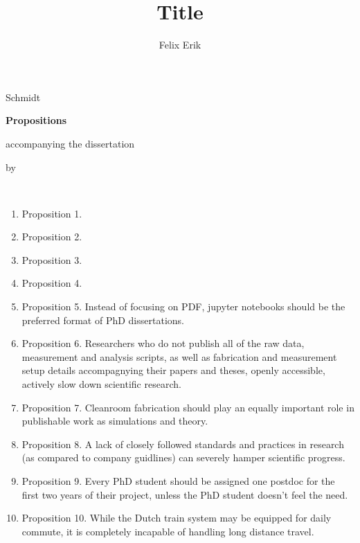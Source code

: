 \documentclass{dissertation}
\begin{document}
\title[Optional Subtitle]{Title}
\author{Felix Erik}{Schmidt}

\begin{center}

{\Large\titlefont\bfseries Propositions}

\bigskip

accompanying the dissertation

\bigskip

{\makeatletter
\titlestyle\bfseries\large\@title
\makeatother}

{\makeatletter
\ifx\@subtitle\undefined\else
    \titlefont\titleshape\@subtitle
\fi
\makeatother}

\bigskip

by

\bigskip

\makeatletter
{\large\titlefont\bfseries\@firstname\ {\titleshape\@lastname}}
\makeatother

\end{center}

\bigskip
\bigskip

\begin{enumerate}

\item Proposition 1.
\item Proposition 2.
\item Proposition 3.
\item Proposition 4.
\item Proposition 5. Instead of focusing on PDF, jupyter notebooks should be the preferred format of PhD dissertations.
\item Proposition 6. Researchers who do not publish all of the raw data, measurement and analysis scripts, as well as fabrication and measurement setup details accompagnying their papers and theses, openly accessible, actively slow down scientific research.
\item Proposition 7. Cleanroom fabrication should play an equally important role in publishable work as simulations and theory.
\item Proposition 8. A lack of closely followed standards and practices in research (as compared to company guidlines) can severely hamper scientific progress.
\item Proposition 9. Every PhD student should be assigned one postdoc for the first two years of their project, unless the PhD student doesn't feel the need.
\item Proposition 10. While the Dutch train system may be equipped for daily commute, it is completely incapable of handling long distance travel.

\end{enumerate}
\end{document}
